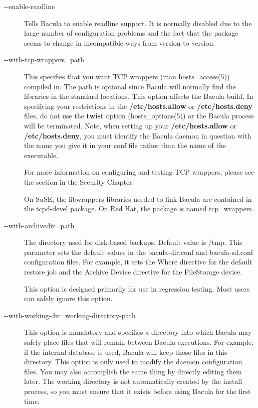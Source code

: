 \begin{description}
\item [ {-}{-}enable-readline]
   Tells Bacula to enable readline support.  It is normally disabled due to the
   large number of configuration  problems and the fact that the package seems to
   change in incompatible  ways from version to version.  

\item [ {-}{-}with-tcp-wrappers=\lt{}path\gt{}]
   This specifies that you  want TCP wrappers (man hosts\_access(5)) compiled in.
   The path is optional since  Bacula will normally find the libraries in the
   standard locations.  This option affects the Bacula build.  In specifying your
   restrictions in the {\bf /etc/hosts.allow}  or {\bf /etc/hosts.deny} files, do
   not use the {\bf twist}  option (hosts\_options(5)) or the Bacula process will
   be terminated. Note, when setting up your {\bf /etc/hosts.allow}
   or {\bf /etc/hosts.deny}, you must identify the Bacula daemon in
   question with the name you give it in your conf file rather than the
   name of the executable.
   
   For more information on configuring and testing TCP wrappers, please  see the 
     section
   in the Security Chapter.  

   On SuSE, the libwrappers libraries needed to link Bacula are
   contained in the tcpd-devel package. On Red Hat, the package is named
   tcp\_wrappers.

\item [ {-}{-}with-archivedir=\lt{}path\gt{} ]
   The directory used for disk-based backups.  Default value is /tmp.
   This parameter sets the default values in the bacula-dir.conf and bacula-sd.conf
   configuration files.  For example, it sets the Where directive for the
   default restore job and the Archive Device directive for the FileStorage
   device.

   This option is designed primarily for use in regression testing.
   Most users can safely ignore this option.

\item [ {-}{-}with-working-dir=\lt{}working-directory-path\gt{} ]
   This option is mandatory and specifies a directory  into which Bacula may
   safely place files that  will remain between Bacula executions. For example, 
   if the internal database is used, Bacula will keep  those files in this
   directory.  This option is only used to modify the daemon  configuration
   files. You may also accomplish the same  thing by directly editing them later.
   The working directory  is not automatically created by the install process, so
   you  must ensure that it exists before using Bacula for the  first time. 


\end{description}
